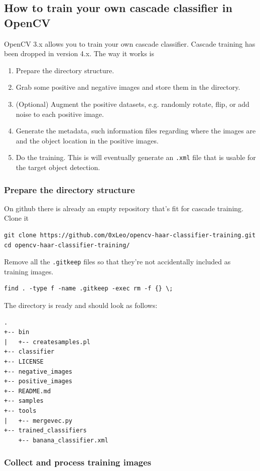 \documentclass[a4paper]{article}
\begin{document}
\subsection{How to train your own cascade classifier in OpenCV}


OpenCV 3.x allows you to train your own cascade classifier. Cascade training has been dropped in version 4.x. The way it works is 
\begin{enumerate}
    \item Prepare the directory structure.
    \item Grab some positive and negative images and store them in the directory.
    \item (Optional) Augment the positive datasets, e.g. randomly rotate, flip, or add noise to each positive image.
    \item Generate the metadata, such information files regarding where the images are and the object location in the positive images.
    \item Do the training. This is will eventually generate an \texttt{.xml} file that is usable for the target object detection.
\end{enumerate}


\subsubsection{Prepare the directory structure}

On github there is already an empty repository that's fit for cascade training. Clone it
\begin{verbatim}
git clone https://github.com/0xLeo/opencv-haar-classifier-training.git
cd opencv-haar-classifier-training/
\end{verbatim}
Remove all the \texttt{.gitkeep} files so that they're not accidentally included as training images.
\begin{verbatim}
find . -type f -name .gitkeep -exec rm -f {} \;
\end{verbatim}
The directory is ready and should look as follows:
\begin{verbatim}
.
+-- bin
|   +-- createsamples.pl
+-- classifier
+-- LICENSE
+-- negative_images
+-- positive_images
+-- README.md
+-- samples
+-- tools
|   +-- mergevec.py
+-- trained_classifiers
    +-- banana_classifier.xml
\end{verbatim}



\subsubsection{Collect and process training images}
\end{document}
